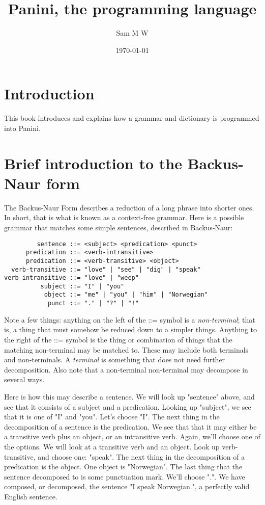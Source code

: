 \documentclass{article}
\title{Panini, the programming language}
\author{Sam M W}
\date{\today}
\begin{document}
\label{start}

\maketitle

\section{Introduction}

This book introduces and explains how a grammar and dictionary is programmed into Panini.

\section{Brief introduction to the Backus-Naur form}
The Backus-Naur Form describes a reduction of a long phrase into shorter ones. In short, that is what is known as a context-free 
grammar. Here is a possible grammar that matches some simple sentences, described in Backus-Naur:

\begin{lstlisting}
         sentence ::= <subject> <predication> <punct>
      predication ::= <verb-intransitive>
      predication ::= <verb-transitive> <object>
  verb-transitive ::= "love" | "see" | "dig" | "speak"
verb-intransitive ::= "love" | "weep" 
          subject ::= "I" | "you"
           object ::= "me" | "you" | "him" | "Norwegian"
            punct ::= "." | "?" | "!"
\end{lstlisting}
Note a few things: anything on the left of the ::= symbol is a \emph{non-terminal}; that is, a thing that must somehow be reduced 
down to a simpler things. Anything to the right of the ::= symbol is the thing or combination of things that the matching 
non-terminal may be matched to. These may include both terminals and non-terminals. A \emph{terminal} is something that does not
need further decomposition. Also note that a non-terminal non-terminal may decompose in several ways.

Here is how this may describe a sentence. We will look up "sentence" above, and see that it consists of a subject and a predication.
Looking up "subject", we see that it is one of "I" and "you". Let's choose "I". The next thing in the decomposition of a sentence is
the predication. We see that that it may either be a transitive verb plus an object, or an intransitive verb. Again, we'll choose 
one of the options. We will look at a transitive verb and an object. Look up verb-transitive, and choose one: "speak". The next 
thing in the decomposition of a predication is the object. One object is "Norwegian". The last thing that the sentence decomposed to
is some punctuation mark. We'll choose ".". We have composed, or decomposed, the sentence "I speak Norwegian.", a perfectly valid 
English sentence.
\end{document}
